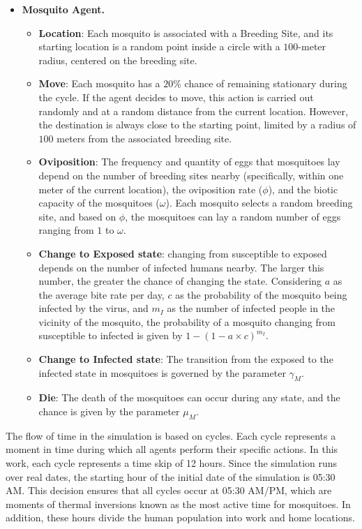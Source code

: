 \begin{itemize}
	\item \textbf{Mosquito Agent.}
	      \begin{itemize}
		      \item \textbf{Location}: Each mosquito is associated with a Breeding Site,
		            and its starting location is a random point inside a circle with a
		            $100$-meter radius, centered on the breeding site.
		      \item \textbf{Move}: Each mosquito has a $20\%$ chance of remaining
		            stationary during the cycle. If the agent decides to move, this action is
		            carried out randomly and at a random distance from the current location.
		            However, the destination is always close to the starting point, limited by a
		            radius of $100$ meters from the associated breeding site.
		      \item  \textbf{Oviposition}: The frequency and quantity of eggs that
		            mosquitoes lay depend on the number of breeding sites nearby (specifically,
		            within one meter of the current location), the oviposition rate ($\phi$),
		            and the biotic capacity of the mosquitoes ($\omega$). Each mosquito selects
		            a random breeding site, and based on $\phi$, the mosquitoes can lay a random
		            number of eggs ranging from $1$ to $\omega$.
		      \item \textbf{Change to Exposed state}: changing from susceptible to exposed
		            depends on the number of infected humans nearby. The larger this number, the
		            greater the chance of changing the state. Considering $a$ as the average
		            bite rate per day, $c$ as the probability of the mosquito being infected by
		            the virus, and $m_I$ as the number of infected people in the vicinity of the
		            mosquito, the probability of a mosquito changing from susceptible to
		            infected is given by $1 - (1 - a \times c)^{m_I}$.
		      \item \textbf{Change to  Infected state}: The transition from the exposed to
		            the infected state in mosquitoes is governed by the parameter $\gamma_M$.
		      \item \textbf{Die}: The death of the mosquitoes can occur during any state,
		            and the chance is given by the parameter $\mu_M$.
	      \end{itemize}
\end{itemize}

The flow of time in the simulation is based on cycles. Each cycle represents a
moment in time during which all agents perform their specific actions. In this
work, each cycle represents a time skip of 12 hours. Since the simulation runs
over real dates, the starting hour of the initial date of the simulation is
05:30 AM. This decision ensures that all cycles occur at 05:30 AM/PM, which are
moments of thermal inversions known as the most active time for mosquitoes. In
addition, these hours divide the human population into work and home locations.

